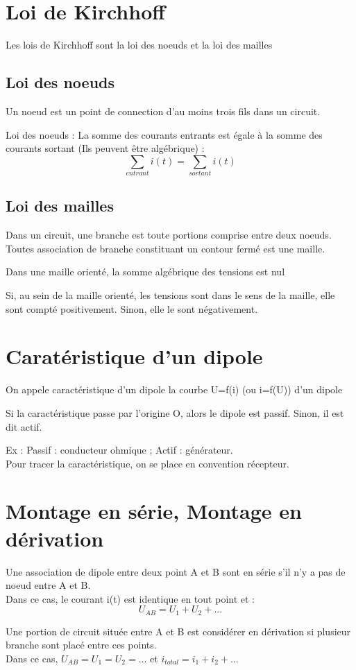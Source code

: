 \section{Loi de Kirchhoff}
Les lois de Kirchhoff sont la loi des noeuds et la loi des mailles
\subsection{Loi des noeuds}
Un noeud est un point de connection d'au moins trois fils dans un circuit.
\begin{loi}
Loi des noeuds : La somme des courants entrants est égale à la somme des courants sortant (Ils peuvent être algébrique) :
$$\sum_{entrant}i(t) = \sum_{sortant}i(t)$$
\end{loi}
\subsection{Loi des mailles}
Dans un circuit, une branche est toute portions comprise entre deux noeuds. Toutes association de branche constituant un contour fermé est une maille.
\begin{loi}
Dans une maille orienté, la somme algébrique des tensions est nul
\end{loi}
Si, au sein de la maille orienté, les tensions sont dans le sens de la maille, elle sont compté positivement. Sinon, elle le sont négativement.
\section{Caratéristique d'un dipole}
\begin{de}
On appele caractéristique d'un dipole la courbe U=f(i) (ou i=f(U)) d'un dipole
\end{de}
\begin{prop}
Si la caractéristique passe par l'origine O, alors le dipole est passif. Sinon, il est dit actif.
\end{prop}
Ex : Passif : conducteur ohmique ; Actif : générateur.\\
Pour tracer la caractéristique, on se place en convention récepteur.
\section{Montage en série, Montage en dérivation}
\begin{de}
Une association de dipole entre deux point A et B sont en série s'il n'y a pas de noeud entre A et B.\\
Dans ce cas, le courant i(t) est identique en tout point et :
$$U_{AB} = U_1 + U_2 + ...$$
\end{de}
\begin{de}
Une portion de circuit située entre A et B est considérer en dérivation si plusieur branche sont placé entre ces points.\\
Dans ce cas, $U_{AB}= U_1 = U_2 = ...$ et $i_{total} = i_1 + i_2 + ...$
\end{de}
